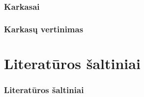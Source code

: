 \documentclass[12pt]{beamer}
\begin{document}
\begin{frame}
    \frametitle{Karkasai}
\end{frame}

\begin{frame}
    \frametitle{Karkasų vertinimas}
\end{frame}

\section{Literatūros šaltiniai}
\begin{frame}[t,allowframebreaks]
    \frametitle{Literatūros šaltiniai}
    \printbibliography
\end{frame}
\end{document}
